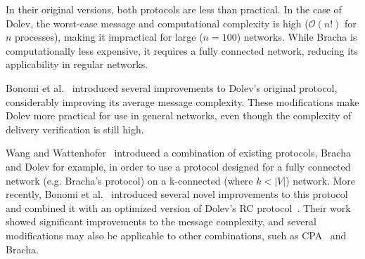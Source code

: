 In their original versions, both protocols are less than practical. In the case of Dolev, the worst-case message and computational complexity is high ($\mathcal{O}(n!)$ for $n$ processes), making it impractical for large ($n=100$) networks. While Bracha is computationally less expensive, it requires a fully connected network, reducing its applicability in regular networks.

Bonomi et al.~\cite{bonomi2019multihop} introduced several improvements to Dolev's original protocol, considerably improving its average message complexity. These modifications make Dolev more practical for use in general networks, even though the complexity of delivery verification is still high. 

Wang and Wattenhofer~\cite{bracha-dolev} introduced a combination of existing protocols, 
Bracha and Dolev for example, in order to use a protocol designed for a fully connected network (e.g. Bracha's protocol) on a k-connected (where $k < |V|$) network. More recently, Bonomi et al.~\cite{bonomi2021practical} introduced several novel improvements to this protocol and combined it with an optimized version of Dolev's RC protocol~\cite{bonomi2019multihop,dolev-improvement}. 
Their work showed significant improvements to the message complexity, and several modifications may also be applicable to other combinations, such as CPA~\cite{cpa} and Bracha.

